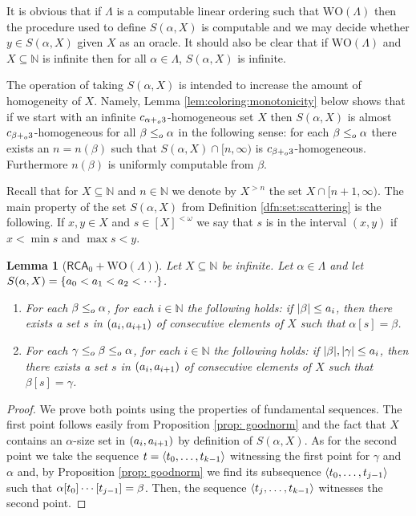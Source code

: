 \documentclass[11pt]{amsart}
\newtheorem{lemma}[thm]{Lemma}
\theoremstyle{definition}
\theoremstyle{remark}
\theoremstyle{plain}
\newcommand{\numberset}{\mathbb}
\newcommand{\N}{\numberset{N}}
\def\a{\alpha}
\newcommand{\RCA}{\mathsf{RCA}_0}
\newcommand{\set}[1]{{\{{#1}\}}}
\def\WO{{\textrm{WO}}}
\newcommand{\leqo}{\leq\sb{o}}
\newcommand{\pluso}{+\sb{o}}
\def\N{{\mathbb{N}}}
\begin{document}
It is obvious that if $\Lambda$ is a computable linear ordering such that $\WO(\Lambda)$ then the procedure used to define $S(\alpha, X)$ is computable and we may decide whether $y\in S(\alpha,X)$ given $X$ as an oracle.
It should also be clear that if $\WO(\Lambda)$ and $X\subseteq\N$ is infinite then for all $\alpha\in\Lambda$, $S(\alpha,X)$ is infinite.

The operation of taking $S(\alpha,X)$ is intended to increase the amount of homogeneity of $X$. 
Namely, Lemma \ref{lem:coloring:monotonicity} below shows that if we start with an infinite $c\sb{\alpha \pluso 3}$-homogeneous set $X$ then $S(\alpha,X)$ is almost $c\sb{\beta \pluso 3}$-homogeneous for all $\beta\leqo \alpha$ in the following sense: for each $\beta \leqo \alpha$ there exists an $n=n(\beta)$ such that $S(\alpha, X)\cap [n, \infty)$ is $c_{\beta\pluso3}$-homogeneous. 
Furthermore $n(\beta)$ is uniformly computable from $\beta$. 

Recall that for $X\subseteq\N$ and $n\in\N$ we denote by $X^{>n}$ the set $X \cap [n+1, \infty)$.
The main property of the set $S(\a, X)$ from Definition \ref{dfn:set:scattering} is the following. 
If $x, y \in X$ and $s \in [X]^{<\omega}$ we say that $s$ is in the interval $(x,y)$ if $x < \min s$ and $\max s < y$. 

\begin{lemma}[$\RCA+\WO(\Lambda)$]\label{lem:scattering:properties}
Let $X\subseteq\N$ be infinite.
Let $\alpha\in\Lambda$ and let $S(\alpha,X) = \set{a\sb0 < a\sb1 < a\sb 2 < \cdots}$.
\begin{enumerate}
\item For each $\beta\leqo \alpha$, for each $i\in\N$ the following holds: if $|\beta| \leq a\sb i$, then there exists a set $s$ in $(a\sb i,a\sb{i+1})$ of consecutive elements of $X$ such that $\alpha[s] =\beta$.
\item For each $\gamma\leqo\beta\leqo \alpha$, for each $i\in\N$ the following holds: if $|\beta|,|\gamma|\leq a\sb i$, then there exists a set $s$ in $(a\sb i, a\sb{i+1})$ of consecutive elements of $X$ such that $\beta[s]=\gamma$.
\end{enumerate}
\end{lemma}

\begin{proof}
We prove both points using the properties of fundamental sequences. 
The first point follows easily from Proposition \ref{prop: goodnorm} and the fact that $X$ contains an $\alpha$-size set in $(a\sb i, a\sb{i+1})$ by definition of $S(\alpha, X)$.
As for the second point we take the sequence $t=\langle t\sb0,\dots,t\sb {k-1}\rangle$ witnessing the first point for $\gamma$ and $\alpha$ and, by Proposition \ref{prop: goodnorm} we find its subsequence $\langle t\sb 0,\dots, t\sb {j-1}\rangle$ such that $\alpha[t\sb 0]\cdots [t\sb {j-1}]=\beta$. 
Then, the sequence $\langle t\sb j,\dots, t\sb {k-1}\rangle$ witnesses the second point.
\end{proof}
\end{document}
